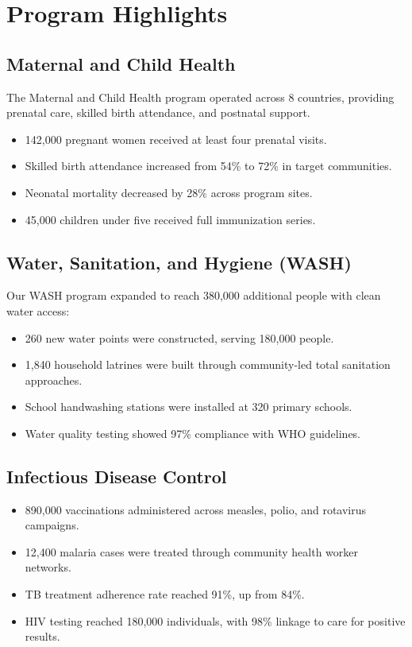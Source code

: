 \documentclass[
    language=english,
    doctype=impact-report,
    institution=none,
]{../../omnilatex}
\begin{document}
\section{Program Highlights}

\subsection{Maternal and Child Health}

The Maternal and Child Health program operated across 8 countries, providing
prenatal care, skilled birth attendance, and postnatal support.

\begin{itemize}
    \item 142,000 pregnant women received at least four prenatal visits.
    \item Skilled birth attendance increased from 54\% to 72\% in target
          communities.
    \item Neonatal mortality decreased by 28\% across program sites.
    \item 45,000 children under five received full immunization series.
\end{itemize}

\subsection{Water, Sanitation, and Hygiene (WASH)}

Our WASH program expanded to reach 380,000 additional people with clean
water access:

\begin{itemize}
    \item 260 new water points were constructed, serving 180,000 people.
    \item 1,840 household latrines were built through community-led
          total sanitation approaches.
    \item School handwashing stations were installed at 320 primary schools.
    \item Water quality testing showed 97\% compliance with WHO guidelines.
\end{itemize}

\subsection{Infectious Disease Control}

\begin{itemize}
    \item 890,000 vaccinations administered across measles, polio, and
          rotavirus campaigns.
    \item 12,400 malaria cases were treated through community health worker
          networks.
    \item TB treatment adherence rate reached 91\%, up from 84\%.
    \item HIV testing reached 180,000 individuals, with 98\% linkage to care
          for positive results.
\end{itemize}
\end{document}
